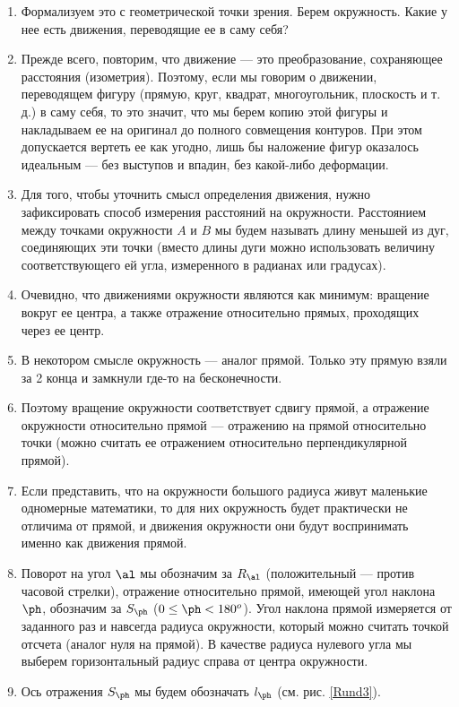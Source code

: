\begin{enumerate}
\item Формализуем это с геометрической точки зрения. Берем окружность. Какие у нее есть движения, переводящие ее в саму себя?
\item Прежде всего, повторим, что движение --- это преобразование, сохраняющее расстояния (изометрия). Поэтому, если мы говорим о движении, переводящем фигуру (прямую, круг, квадрат, многоугольник, плоскость и т.\,д.) в саму себя, то это значит, что мы берем копию этой фигуры и накладываем ее на оригинал до полного совмещения контуров. При этом допускается вертеть ее как угодно, лишь бы наложение фигур оказалось идеальным --- без выступов и впадин, без какой-либо деформации.
\item Для того, чтобы уточнить смысл определения движения, нужно зафиксировать способ измерения расстояний на окружности.  Расстоянием между точками окружности $A$ и $B$ мы будем называть длину меньшей из дуг, соединяющих эти точки (вместо длины дуги можно использовать величину соответствующего ей угла, измеренного в радианах или градусах).
\item Очевидно, что движениями окружности являются как минимум: вращение вокруг ее центра, а также отражение относительно прямых, проходящих через ее центр.
\item В некотором смысле окружность --- аналог прямой. Только эту прямую взяли за 2 конца и замкнули где-то на бесконечности.
\item Поэтому вращение окружности соответствует сдвигу прямой, а отражение окружности относительно прямой --- отражению на прямой относительно точки (можно считать ее отражением относительно перпендикулярной прямой).
\item Если представить, что на окружности большого радиуса живут маленькие одномерные математики, то для них окружность будет практически не отличима от прямой, и движения окружности они будут воспринимать именно как движения прямой.
\item Поворот на угол $\al$ мы обозначим за $R_\al$ (положительный --- против часовой стрелки), отражение относительно прямой, имеющей угол наклона $\ph$, обозначим за $S_\ph$ ($0\le\ph<180^o$). Угол наклона прямой измеряется от заданного раз и навсегда радиуса окружности, который можно считать точкой отсчета (аналог нуля на прямой). В качестве радиуса нулевого угла мы выберем горизонтальный радиус справа от центра окружности.
\item Ось отражения $S_\ph$ мы будем обозначать $l_\ph$ (см. рис. \ref{Rund3}).


\end{enumerate}
